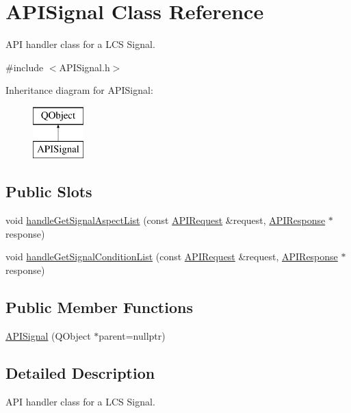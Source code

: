 \hypertarget{class_a_p_i_signal}{}\section{A\+P\+I\+Signal Class Reference}
\label{class_a_p_i_signal}


A\+PI handler class for a L\+CS Signal.  




{\ttfamily \#include $<$A\+P\+I\+Signal.\+h$>$}

Inheritance diagram for A\+P\+I\+Signal\+:\begin{figure}[H]
\begin{center}
\leavevmode
\includegraphics[height=2.000000cm]{class_a_p_i_signal}
\end{center}
\end{figure}
\subsection*{Public Slots}
\begin{DoxyCompactItemize}
\item 
void \hyperlink{class_a_p_i_signal_aa39d78d40fce74c4adff19db446a34c8}{handle\+Get\+Signal\+Aspect\+List} (const \hyperlink{class_a_p_i_request}{A\+P\+I\+Request} \&request, \hyperlink{class_a_p_i_response}{A\+P\+I\+Response} $\ast$response)
\item 
void \hyperlink{class_a_p_i_signal_a0d698251dabf70472533fa99e4f53e48}{handle\+Get\+Signal\+Condition\+List} (const \hyperlink{class_a_p_i_request}{A\+P\+I\+Request} \&request, \hyperlink{class_a_p_i_response}{A\+P\+I\+Response} $\ast$response)
\end{DoxyCompactItemize}
\subsection*{Public Member Functions}
\begin{DoxyCompactItemize}
\item 
\hyperlink{class_a_p_i_signal_ab712db36d6e6281b9b317d60295ca3f6}{A\+P\+I\+Signal} (Q\+Object $\ast$parent=nullptr)
\end{DoxyCompactItemize}


\subsection{Detailed Description}
A\+PI handler class for a L\+CS Signal. 

